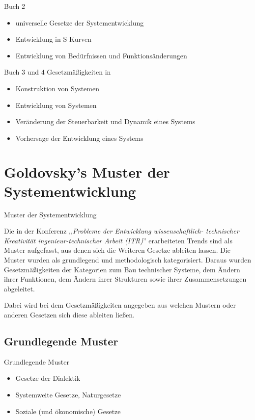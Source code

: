 \documentclass{beamer}
\begin{document}
\begin{frame}{Buch 2}
\begin{itemize}
\item universelle Gesetze der Systementwicklung
\item Entwicklung in S-Kurven
\item Entwicklung von Bedürfnissen und Funktionsänderungen
\end{itemize}
\end{frame}

\begin{frame}{Buch 3 und 4}
Gesetzmäßigkeiten in
\begin{itemize}
\item Konstruktion von Systemen
\item Entwicklung von Systemen\vspace{1cm}
\item Veränderung der Steuerbarkeit und Dynamik eines Systems
\item Vorhersage der Entwicklung eines Systems
\end{itemize}
\end{frame}


\section{Goldovsky's Muster der Systementwicklung}
\begin{frame}{Muster der Systementwicklung}

Die in der Konferenz ,,\emph{Probleme der Entwicklung wissenschaftlich- technischer Kreativität ingenieur-technischer Arbeit (ITR)}'' erarbeiteten Trends sind als Muster aufgefasst, aus denen sich die Weiteren Gesetze ableiten lassen. Die Muster wurden als grundlegend und methodologisch kategorisiert. Daraus wurden Gesetzmäßigkeiten der Kategorien zum Bau technischer Systeme, dem Ändern ihrer Funktionen, dem Ändern ihrer Strukturen sowie ihrer Zusammensetzungen abgeleitet. \medskip

Dabei wird bei dem Gesetzmäßigkeiten angegeben aus welchen Mustern oder anderen Gesetzen sich diese ableiten ließen.

\end{frame}

\subsection{Grundlegende Muster}
\begin{frame}{Grundlegende Muster}
\begin{itemize}
\item Gesetze der Dialektik
\item Systemweite Gesetze, Naturgesetze
\item Soziale (und ökonomische) Gesetze
\end{itemize}
\end{frame}
\end{document}
